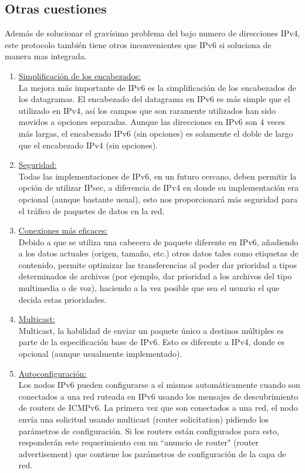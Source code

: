 \documentclass[11pt,a4paper]{article}
\begin{document}
\subsection{Otras cuestiones}
Además de solucionar el gravísimo problema del bajo numero de direcciones IPv4, este protocolo 
también tiene otros inconvenientes que IPv6 si soluciona de manera mas integrada.
\begin{enumerate}

\item \underline{Simplificación de los encabezados:}\\
La mejora más importante de IPv6 es la simplificación de los encabezados de los datagramas. El 
encabezado del datagrama en IPv6 es más simple que el utilizado en IPv4, así los campos que son 
raramente utilizados han sido movidos a opciones separadas. Aunque las direcciones en IPv6 son 4 
veces más largas, el encabezado IPv6 (sin opciones) es solamente el doble de largo que el encabezado 
IPv4 (sin opciones).

\item  \underline{Seguridad:}\\
Todas las implementaciones de IPv6, en un futuro cercano, deben permitir la opción de utilizar 
IPsec, a diferencia de IPv4 en donde su implementación era opcional (aunque bastante usual), esto 
nos proporcionará más seguridad para el tráfico de paquetes de datos en la red.

\item  \underline{Conexiones más eficaces:}\\
Debido a que se utiliza una cabecera de paquete diferente en IPv6, añadiendo a los datos actuales 
(origen, tamaño, etc.) otros datos tales como etiquetas de contenido, permite optimizar las 
transferencias al poder dar prioridad a tipos determinados de archivos (por ejemplo, dar prioridad a 
los archivos del tipo multimedia o de voz), haciendo a la vez posible que sea el usuario el que 
decida estas prioridades.

\item  \underline{Multicast:}\\
Multicast, la habilidad de enviar un paquete único a destinos múltiples es parte de la 
especificación base de IPv6. Esto es diferente a IPv4, donde es opcional (aunque usualmente 
implementado).

\item  \underline{Autoconfiguración:}\\
Los nodos IPv6 pueden configurarse a sí mismos automáticamente cuando son conectados a una red 
ruteada en IPv6 usando los mensajes de descubrimiento de routers de ICMPv6. La primera vez que son 
conectados a una red, el nodo envía una solicitud usando multicast (router solicitation) pidiendo 
los parámetros de configuración. Si los routers están configurados para esto, responderán este 
requerimiento con un ``anuncio de router" (router advertisement) que contiene los parámetros de 
configuración de la capa de red.


\end{enumerate}
\end{document}
